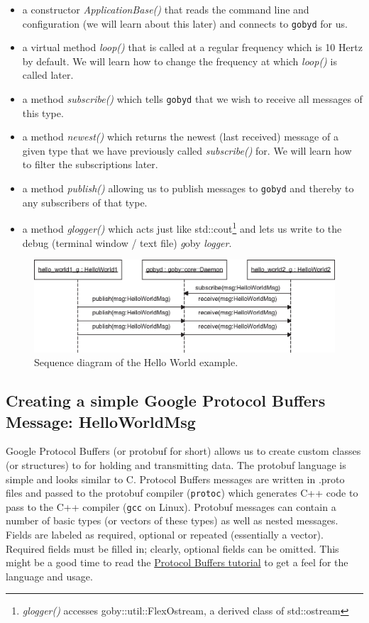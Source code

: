 \documentclass[11pt, letterpaper]{article}
\begin{document}
\begin{itemize}
\item a constructor \textit{ApplicationBase()} that reads the command line and configuration (we will learn about this later) and connects to \texttt{gobyd} for us.
\item a virtual method \textit{loop()} that is called at a regular frequency which is 10 Hertz by default. We will learn how to change the frequency at which \textit{loop()} is called later. 
\item a method \textit{subscribe()} which tells \texttt{gobyd} that we wish to receive all messages of this type.
\item a method \textit{newest()} which returns the newest (last received) message of a given type that we have previously called \textit{subscribe()} for. We will learn how to filter the subscriptions later.
\item a method \textit{publish()} allowing us to publish messages to \texttt{gobyd} and thereby to any subscribers of that type.
\item a method \textit{glogger()} which acts just like std::cout\footnote{\textit{glogger()} accesses goby::util::FlexOstream, a derived class of std::ostream} and lets us write to the debug (terminal window / text file) \textit{g}oby \textit{logger}.
\end{itemize}


\begin{figure}
\centering
\includegraphics[scale=0.9]{hello_world_sequence}
\caption{Sequence diagram of the Hello World example.}
\label{fig:hellow_world_sequence}
\end{figure}


\subsection{Creating a simple Google Protocol Buffers Message: HelloWorldMsg}\label{sec:proto_ex}

Google Protocol Buffers (or protobuf for short) allows us to create custom classes (or structures) to for holding and transmitting data. The protobuf language is simple and looks similar to C. Protocol Buffers messages are written in .proto files and passed to the protobuf compiler (\texttt{protoc}) which generates C++ code to pass to the C++ compiler (\texttt{gcc} on Linux). Protobuf messages can contain a number of basic types (or vectors of these types) as well as nested messages. Fields are labeled as required, optional or repeated (essentially a vector). Required fields must be filled in; clearly, optional fields can be omitted. This might be a good time to read the \href{http://code.google.com/apis/protocolbuffers/docs/cpptutorial.html}{Protocol Buffers tutorial} to get a feel for the language and usage.
\end{document}
